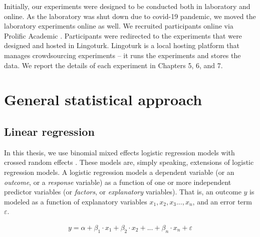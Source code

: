 \documentclass[a4paper, nobind]{templates/ociamthesis}
\begin{document}
Initially, our experiments were designed to be conducted both in laboratory and online.
As the laboratory was shut down due to covid-19 pandemic, we moved the laboratory experiments online as well.
We recruited participants online via Prolific Academic \autocite{Prolific}.
Participants were redirected to the experiments that were designed and hosted in Lingoturk\autocite{Pusse2016}.
Lingoturk is a local hosting platform that manages crowdsourcing experiments -- it runs the experiments and stores the data.
We report the details of each experiment in Chapters 5, 6, and 7.

\hypertarget{general-statistical-approach}{%
\chapter{General statistical approach}\label{general-statistical-approach}}

\hypertarget{linear-regression}{%
\section{Linear regression}\label{linear-regression}}

In this thesis, we use binomial mixed effects logistic regression models with crossed random effects \autocite{Baayen2008}.
These models are, simply speaking, extensions of logistic regression models.
A logistic regression models a dependent variable (or an \emph{outcome}, or a \emph{response} variable) as a function of one or more independent predictor variables (or \emph{factors}, or \emph{explanatory} variables).
That is, an outcome \(y\) is modeled as a function of explanatory variables \(x_1, x_2, x_3..., x_n\), and an error term \(\varepsilon\).

\begin{align} \label{eq:linear_regression}
y =
\alpha + 
\beta_{1}\cdot{x_1} + 
\beta_{2}\cdot{x_2} + ... +
\beta_{n}\cdot{x_n} + \varepsilon 
\end{align}
\end{document}
